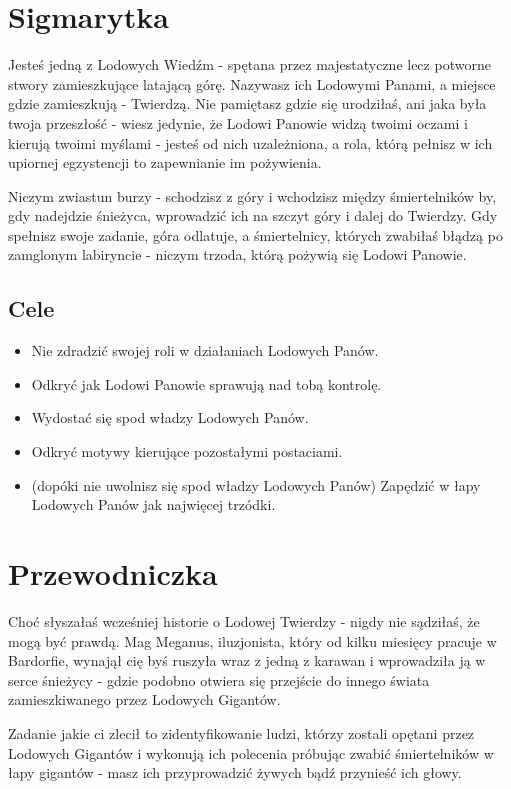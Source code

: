 \documentclass[12pt,a4paper]{article}
\begin{document}
\section*{Sigmarytka}

Jesteś jedną z Lodowych Wiedźm - spętana przez majestatyczne lecz
potworne stwory zamieszkujące latającą górę. Nazywasz ich Lodowymi
Panami, a miejsce gdzie zamieszkują - Twierdzą. Nie pamiętasz gdzie
się urodziłaś, ani jaka była twoja przeszłość - wiesz jedynie, że
Lodowi Panowie widzą twoimi oczami i kierują twoimi myślami - jesteś
od nich uzależniona, a rola, którą pełnisz w ich upiornej egzystencji
to zapewnianie im pożywienia.

Niczym zwiastun burzy - schodzisz z góry i wchodzisz między
śmiertelników by, gdy nadejdzie śnieżyca, wprowadzić ich na szczyt
góry i dalej do Twierdzy. Gdy spełnisz swoje zadanie, góra odlatuje, a
śmiertelnicy, których zwabiłaś błądzą po zamglonym labiryncie - niczym
trzoda, którą pożywią się Lodowi Panowie.

\subsection*{Cele}
\begin{itemize}
\item Nie zdradzić swojej roli w działaniach Lodowych Panów.
\item Odkryć jak Lodowi Panowie sprawują nad tobą kontrolę.
\item Wydostać się spod władzy Lodowych Panów.
\item Odkryć motywy kierujące pozostałymi postaciami.
\item (dopóki nie uwolnisz się spod władzy Lodowych Panów) Zapędzić w
  łapy Lodowych Panów jak najwięcej trzódki.
\end{itemize}

\clearpage

\section*{Przewodniczka}

Choć słyszałaś wcześniej historie o Lodowej Twierdzy - nigdy nie
sądziłaś, że mogą być prawdą. Mag Meganus, iluzjonista, który od kilku
miesięcy pracuje w Bardorfie, wynajął cię byś ruszyła wraz z jedną z
karawan i wprowadziła ją w serce śnieżycy - gdzie podobno otwiera się
przejście do innego świata zamieszkiwanego przez Lodowych Gigantów.

Zadanie jakie ci zlecił to zidentyfikowanie ludzi, którzy zostali
opętani przez Lodowych Gigantów i wykonują ich polecenia próbując
zwabić śmiertelników w łapy gigantów - masz ich przyprowadzić żywych
bądź przynieść ich głowy.
\end{document}
